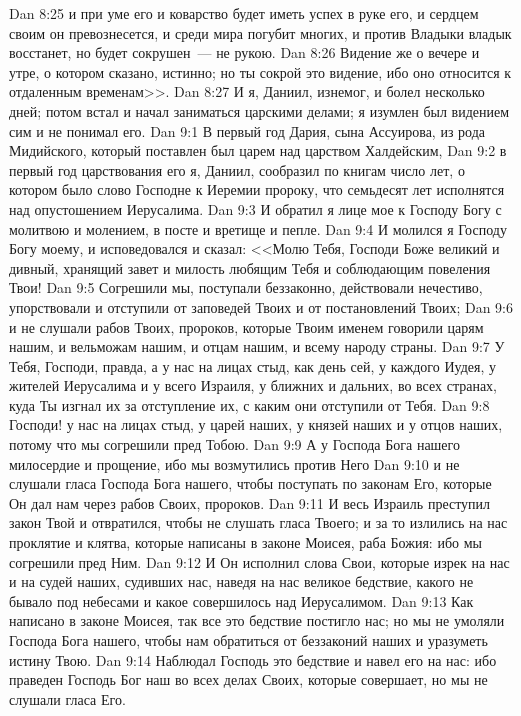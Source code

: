 \vs Dan 8:25 и при уме его и коварство будет иметь успех в руке его, и сердцем своим он превознесется, и среди мира погубит многих, и против Владыки владык восстанет, но будет сокрушен~--- не рукою.
\vs Dan 8:26 Видение же о вечере и утре, о котором сказано, истинно; но ты сокрой это видение, ибо оно относится к отдаленным временам>>.
\rsbpar\vs Dan 8:27 И я, Даниил, изнемог, и болел несколько дней; потом встал и начал заниматься царскими делами; я изумлен был видением сим и не понимал его.
\vs Dan 9:1 В первый год Дария, сына Ассуирова, из рода Мидийского, который поставлен был царем над царством Халдейским,
\vs Dan 9:2 в первый год царствования его я, Даниил, сообразил по книгам число лет, о котором было слово Господне к Иеремии пророку, что семьдесят лет исполнятся над опустошением Иерусалима.
\vs Dan 9:3 И обратил я лице мое к Господу Богу с молитвою и молением, в посте и вретище и пепле.
\vs Dan 9:4 И молился я Господу Богу моему, и исповедовался и сказал: <<Молю Тебя, Господи Боже великий и дивный, хранящий завет и милость любящим Тебя и соблюдающим повеления Твои!
\vs Dan 9:5 Согрешили мы, поступали беззаконно, действовали нечестиво, упорствовали и отступили от заповедей Твоих и от постановлений Твоих;
\vs Dan 9:6 и не слушали рабов Твоих, пророков, которые Твоим именем говорили царям нашим, и вельможам нашим, и отцам нашим, и всему народу страны.
\vs Dan 9:7 У Тебя, Господи, правда, а у нас на лицах стыд, как день сей, у каждого Иудея, у жителей Иерусалима и у всего Израиля, у ближних и дальних, во всех странах, куда Ты изгнал их за отступление их, с каким они отступили от Тебя.
\vs Dan 9:8 Господи! у нас на лицах стыд, у царей наших, у князей наших и у отцов наших, потому что мы согрешили пред Тобою.
\vs Dan 9:9 А у Господа Бога нашего милосердие и прощение, ибо мы возмутились против Него
\vs Dan 9:10 и не слушали гласа Господа Бога нашего, чтобы поступать по законам Его, которые Он дал нам через рабов Своих, пророков.
\vs Dan 9:11 И весь Израиль преступил закон Твой и отвратился, чтобы не слушать гласа Твоего; и за то излились на нас проклятие и клятва, которые написаны в законе Моисея, раба Божия: ибо мы согрешили пред Ним.
\vs Dan 9:12 И Он исполнил слова Свои, которые изрек на нас и на судей наших, судивших нас, наведя на нас великое бедствие, какого не бывало под небесами и какое совершилось над Иерусалимом.
\vs Dan 9:13 Как написано в законе Моисея, так все это бедствие постигло нас; но мы не умоляли Господа Бога нашего, чтобы нам обратиться от беззаконий наших и уразуметь истину Твою.
\vs Dan 9:14 Наблюдал Господь это бедствие и навел его на нас: ибо праведен Господь Бог наш во всех делах Своих, которые совершает, но мы не слушали гласа Его.
